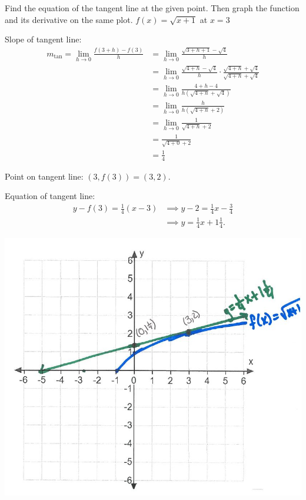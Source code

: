 \documentclass[nooutcomes]{ximera}
\begin{document}
\begin{problem} Find the equation of the tangent line at the given point.  Then graph the function and its derivative on the same plot.
$f(x)=\sqrt{x+1}$ at $x=3$

	\begin{freeResponse}
	Slope of tangent line:
	\begin{align*}	
	m_{\mathrm{tan}} = \lim_{h \to 0} \frac{f(3+h) - f(3)}{h}&=\lim_{h \to 0}\frac{\sqrt{3+h+1} - \sqrt{4}}{h}\\
	&=\lim_{h \to 0}\frac{\sqrt{4+h} - \sqrt{4}}{h} \cdot \frac{\sqrt{4+h} + \sqrt{4}}{\sqrt{4+h} + \sqrt{4}}\\
	&=\lim_{h \to 0}\frac{4+h-4}{h(\sqrt{4+h} + \sqrt{4})}\\
	&=\lim_{h \to 0}\frac{h}{h(\sqrt{4+h} + 2)}\\
	&=\lim_{h \to 0}\frac{1}{\sqrt{4+h} + 2}\\
	&=\frac{1}{\sqrt{4+0} + 2}\\
	&=\frac{1}{4}
	\end{align*}

        Point on tangent line: $(3, f(3)) = (3, 2)$.

        Equation of tangent line:
        \begin{align*}
          y - f(3) =  \frac{1}{4}(x-3) &\implies y - 2 = \frac{1}{4}x - \frac{3}{4}\\
          &\implies y = \frac{1}{4}x + 1\frac{1}{4}.
        \end{align*}
	        \begin{image}
          \includegraphics[scale = 0.6]{Figure5.JPG}
        \end{image}

	\end{freeResponse}

\end{problem}
\end{document}
